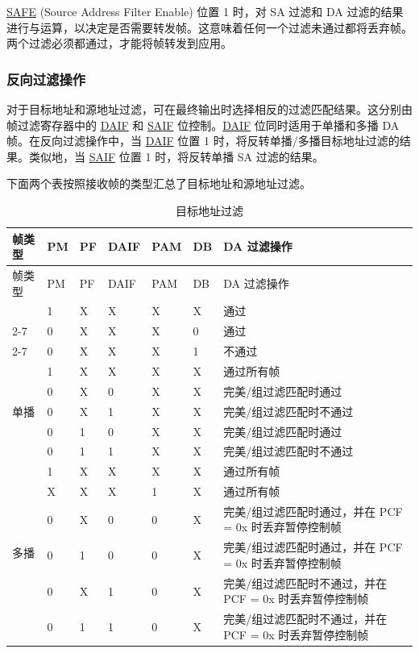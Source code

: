\documentclass[main\_\_CN.tex]{subfiles}
\begin{document}
\hyperref[regdesc:EMACFFREG]{SAFE} (Source Address Filter Enable) 位置 1 时，对 SA 过滤和 DA 过滤的结果 进行与运算，以决定是否需要转发帧。这意味着任何一个过滤未通过都将丢弃帧。两个过滤必须都通过，才能将帧转发到应用。

\subsubsection{反向过滤操作 }
对于目标地址和源地址过滤，可在最终输出时选择相反的过滤匹配结果。这分别由帧过滤寄存器中的 \hyperref[regdesc:EMACFFREG]{DAIF} 和 \hyperref[regdesc:EMACFFREG]{SAIF} 位控制。\hyperref[regdesc:EMACFFREG]{DAIF} 位同时适用于单播和多播 DA 帧。在反向过滤操作中，当 \hyperref[regdesc:EMACFFREG]{DAIF} 位置 1 时，将反转单播/多播目标地址过滤的结果。类似地，当 \hyperref[regdesc:EMACFFREG]{SAIF} 位置 1 时，将反转单播 SA 过滤的结果。

下面两个表按照接收帧的类型汇总了目标地址和源地址过滤。

\begin{longtable}[l]{ |p{1.3cm}|p{1cm}|p{1cm}|p{1cm}|p{1cm}|p{1cm}|p{8cm}| }
\caption{目标地址过滤} \label{tab:ethernetmac-Destination Address Filtering}\\
\hline
\rowcolor{lightgray}
帧类型 &PM & PF  & DAIF & PAM & DB & DA 过滤操作  \\
\hline
\endfirsthead
\hline
\rowcolor{lightgray}
帧类型 &PM & PF  & DAIF & PAM & DB & DA 过滤操作 \\
\hline
\endhead
\endfoot
\multirow{3}{*}{广播}& 1&X&X&X&X&通过\\
\cline{2-7}
&0&X&X&X&0&通过\\
\cline{2-7}
&0&X&X&X&1&不通过\\\hline

\multirow{5}{*}{单播}&
1&X&X&X&X&通过所有帧\\\cline{2-7}

&0&X&0&X&X&完美/组过滤匹配时通过\\\cline{2-7}

&0&X&1&X&X&完美/组过滤匹配时不通过\\\cline{2-7}

&0&1&0&X&X&完美/组过滤匹配时通过\\\cline{2-7}

&0&1&1&X&X&完美/组过滤匹配时不通过\\\hline

\multirow{10}{*}{多播}&
1&X&X&X&X&通过所有帧\\\cline{2-7}

&X&X&X&1&X&通过所有帧\\\cline{2-7}

&0&X&0&0&X&完美/组过滤匹配时通过，并在 PCF = 0x 时丢弃暂停控制帧\\\cline{2-7}

&0&1&0&0&X&完美/组过滤匹配时通过，并在 PCF = 0x 时丢弃暂停控制帧\\\cline{2-7}

&0&X&1&0&X&完美/组过滤匹配时不通过，并在 PCF = 0x 时丢弃暂停控制帧\\\cline{2-7}

&0&1&1&0&X&完美/组过滤匹配时不通过，并在 PCF = 0x 时丢弃暂停控制帧\\\hline
\end{longtable}
\end{document}
